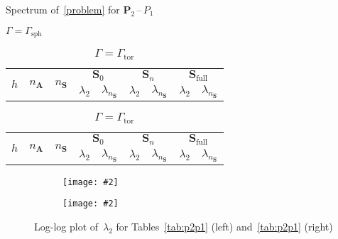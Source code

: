 \documentclass[12pt]{article}
\newcommand{\includegraphicsw}[2][1.]{\texttt{[image: \#2]}}
\newcommand{\vect}[1]{\boldsymbol{\mathbf{#1}}}
\newcommand{\sphere}{{\Gamma_{\text{sph}}}}
\newcommand{\tor}{{\Gamma_{\text{tor}}}}
\begin{document}
\begin{table}[h]
	\centering\small
	\caption{Spectrum of~\eqref{problem} for $\vect P_2$\,--\,$P_1$} 
	\label{tab:p2p1}
	\begin{subtable}{1.\linewidth}
		\centering
		\caption{$\Gamma = \sphere$}
		\label{tab:p2p1:sph}
		\begin{tabular}[1.3]{|c|c|c|c|c|c|c|c|c|}
			\hline
			\multirow{2}{*}{$h$} & \multirow{2}{*}{$n_{\vect A}$} & \multirow{2}{*}{$n_{\vect S}$} & \multicolumn{2}{c|}{$\vect S_0$} & \multicolumn{2}{c|}{$\vect S_n$} & \multicolumn{2}{c|}{$\vect S_{\text{full}}$} \\ 
			\cline{4-9}
			& & & $\lambda_2$ & $\lambda_{n_{\vect S}}$ & $\lambda_2$ & $\lambda_{n_{\vect S}}$ & $\lambda_2$ & $\lambda_{n_{\vect S}}$ \\ 
			\hline
			
		\end{tabular}
	\end{subtable}%
	\vskip 3mm
	\begin{subtable}{1.\linewidth}
		\centering
		\caption{$\Gamma = \tor$}
		\label{tab:p2p1:tor}
		\begin{tabular}[1.3]{|c|c|c|c|c|c|c|c|c|}
			\hline
			\multirow{2}{*}{$h$} & \multirow{2}{*}{$n_{\vect A}$} & \multirow{2}{*}{$n_{\vect S}$} & \multicolumn{2}{c|}{$\vect S_0$} & \multicolumn{2}{c|}{$\vect S_n$} & \multicolumn{2}{c|}{$\vect S_{\text{full}}$} \\ 
			\cline{4-9}
			& & & $\lambda_2$ & $\lambda_{n_{\vect S}}$ & $\lambda_2$ & $\lambda_{n_{\vect S}}$ & $\lambda_2$ & $\lambda_{n_{\vect S}}$ \\ 
			\hline
			
		\end{tabular}
	\end{subtable}
\end{table}
\vfill
\begin{figure}[h]
	\centering\small
	\begin{subfigure}{.49\linewidth}
		\centering
		\includegraphicsw{sphere_2_P2P1.png}
	\end{subfigure}%
	\hfill
	\begin{subfigure}{.49\linewidth}
		\centering
		\includegraphicsw{torus_P2P1.png}
	\end{subfigure}
	\caption{Log-log plot of~$\lambda_2$ for Tables~\ref{tab:p2p1} (left) and~\ref{tab:p2p1} (right)}
\end{figure}
\vfill

\clearpage
\end{document}
